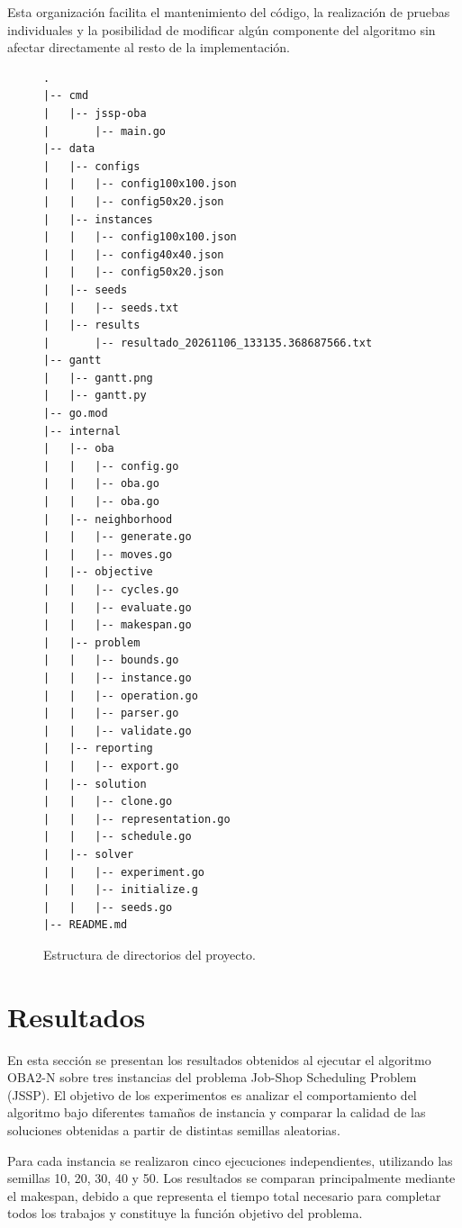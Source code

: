 \documentclass[12pt,a4paper]{article}
\begin{document}
Esta organización facilita el mantenimiento del código, la realización de pruebas individuales y la posibilidad de modificar algún componente del algoritmo sin afectar directamente al resto de la implementación.

\begin{figure}[H]
    \centering
    \begin{minipage}{0.92\textwidth}
\begin{lstlisting}
.
|-- cmd
|   |-- jssp-oba
|       |-- main.go
|-- data
|   |-- configs
|   |   |-- config100x100.json
|   |   |-- config50x20.json
|   |-- instances
|   |   |-- config100x100.json
|   |   |-- config40x40.json
|   |   |-- config50x20.json
|   |-- seeds
|   |   |-- seeds.txt
|   |-- results
|       |-- resultado_20261106_133135.368687566.txt
|-- gantt
|   |-- gantt.png
|   |-- gantt.py
|-- go.mod
|-- internal
|   |-- oba
|   |   |-- config.go
|   |   |-- oba.go
|   |   |-- oba.go
|   |-- neighborhood
|   |   |-- generate.go
|   |   |-- moves.go
|   |-- objective
|   |   |-- cycles.go
|   |   |-- evaluate.go
|   |   |-- makespan.go
|   |-- problem
|   |   |-- bounds.go
|   |   |-- instance.go
|   |   |-- operation.go
|   |   |-- parser.go
|   |   |-- validate.go
|   |-- reporting
|   |   |-- export.go
|   |-- solution
|   |   |-- clone.go
|   |   |-- representation.go
|   |   |-- schedule.go
|   |-- solver
|   |   |-- experiment.go
|   |   |-- initialize.g
|   |   |-- seeds.go
|-- README.md
\end{lstlisting}
    \end{minipage}
    \caption{Estructura de directorios del proyecto.}
    \label{fig:arbol}
\end{figure}


\section{Resultados}
\label{sec:resultados}

En esta sección se presentan los resultados obtenidos al ejecutar el algoritmo OBA2-N sobre tres instancias del problema Job-Shop Scheduling Problem (JSSP). El objetivo de los experimentos es analizar el comportamiento del algoritmo bajo diferentes tamaños de instancia y comparar la calidad de las soluciones obtenidas a partir de distintas semillas aleatorias.

Para cada instancia se realizaron cinco ejecuciones independientes, utilizando las semillas 10, 20, 30, 40 y 50. Los resultados se comparan principalmente mediante el makespan, debido a que representa el tiempo total necesario para completar todos los trabajos y constituye la función objetivo del problema.
\end{document}
